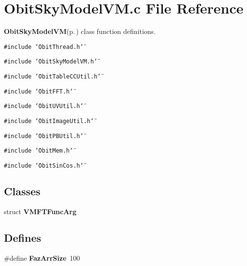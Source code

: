 \section{Obit\-Sky\-Model\-VM.c File Reference}
\label{ObitSkyModelVM_8c}
{\bf Obit\-Sky\-Model\-VM}{\rm (p.\,\pageref{structObitSkyModelVM})} class function definitions. 

{\tt \#include \char`\"{}Obit\-Thread.h\char`\"{}}\par
{\tt \#include \char`\"{}Obit\-Sky\-Model\-VM.h\char`\"{}}\par
{\tt \#include \char`\"{}Obit\-Table\-CCUtil.h\char`\"{}}\par
{\tt \#include \char`\"{}Obit\-FFT.h\char`\"{}}\par
{\tt \#include \char`\"{}Obit\-UVUtil.h\char`\"{}}\par
{\tt \#include \char`\"{}Obit\-Image\-Util.h\char`\"{}}\par
{\tt \#include \char`\"{}Obit\-PBUtil.h\char`\"{}}\par
{\tt \#include \char`\"{}Obit\-Mem.h\char`\"{}}\par
{\tt \#include \char`\"{}Obit\-Sin\-Cos.h\char`\"{}}\par
\subsection*{Classes}
\begin{CompactItemize}
\item 
struct {\bf VMFTFunc\-Arg}
\end{CompactItemize}
\subsection*{Defines}
\begin{CompactItemize}
\item 
\#define {\bf Faz\-Arr\-Size}\ 100
\end{CompactItemize}
